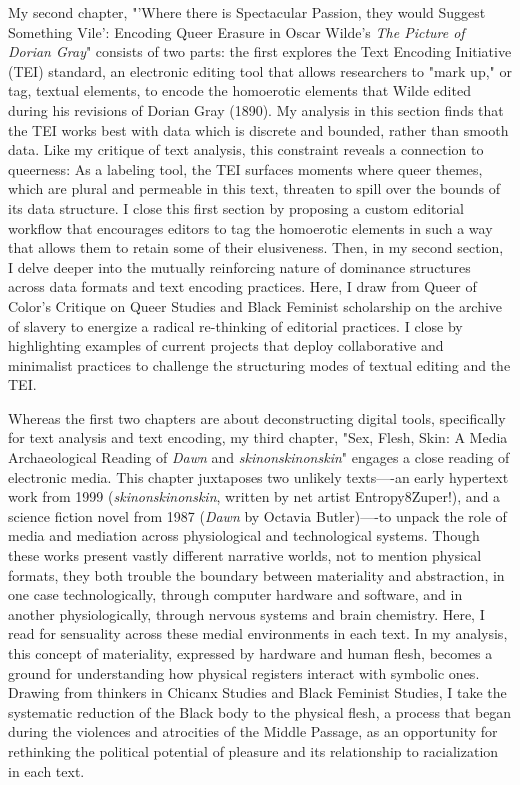 \documentclass[11pt]{article}
\begin{document}
My second chapter, "'Where there is Spectacular Passion, they would
Suggest Something Vile': Encoding Queer Erasure in Oscar Wilde’s \emph{The
Picture of Dorian Gray}" consists of two parts: the first explores the
Text Encoding Initiative (TEI) standard, an electronic editing tool
that allows researchers to "mark up," or tag, textual elements, to
encode the homoerotic elements that Wilde edited during his revisions
of Dorian Gray (1890). My analysis in this section finds that the TEI
works best with data which is discrete and bounded, rather than smooth
data. Like my critique of text analysis, this constraint reveals a
connection to queerness: As a labeling tool, the TEI surfaces moments
where queer themes, which are plural and permeable in this text,
threaten to spill over the bounds of its data structure. I close this
first section by proposing a custom editorial workflow that encourages
editors to tag the homoerotic elements in such a way that allows them
to retain some of their elusiveness. Then, in my second section, I
delve deeper into the mutually reinforcing nature of dominance
structures across data formats and text encoding practices. Here, I
draw from Queer of Color's Critique on Queer Studies and Black
Feminist scholarship on the archive of slavery to energize a radical
re-thinking of editorial practices. I close by highlighting examples
of current projects that deploy collaborative and minimalist practices
to challenge the structuring modes of textual editing and the TEI.

Whereas the first two chapters are about deconstructing digital tools,
specifically for text analysis and text encoding, my third chapter,
"Sex, Flesh, Skin: A Media Archaeological Reading of \emph{Dawn} and
\emph{skinonskinonskin}" engages a close reading of electronic media. This
chapter juxtaposes two unlikely texts—-an early hypertext work from
1999 (\emph{skinonskinonskin}, written by net artist Entropy8Zuper!), and a
science fiction novel from 1987 (\emph{Dawn} by Octavia Butler)—-to unpack
the role of media and mediation across physiological and technological
systems. Though these works present vastly different narrative worlds,
not to mention physical formats, they both trouble the boundary
between materiality and abstraction, in one case technologically,
through computer hardware and software, and in another
physiologically, through nervous systems and brain chemistry. Here, I
read for sensuality across these medial environments in each text. In
my analysis, this concept of materiality, expressed by hardware and
human flesh, becomes a ground for understanding how physical registers
interact with symbolic ones. Drawing from thinkers in Chicanx Studies
and Black Feminist Studies, I take the systematic reduction of the
Black body to the physical flesh, a process that began during the
violences and atrocities of the Middle Passage, as an opportunity for
rethinking the political potential of pleasure and its relationship to
racialization in each text.
\end{document}
